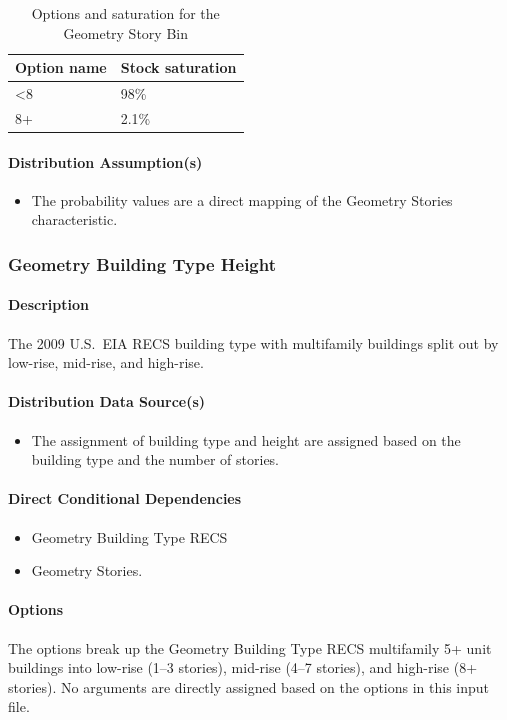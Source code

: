 \begin{longtable}[]{@{}ll@{}}
\caption{Options and saturation for the Geometry Story Bin}  \\
\toprule\noalign{}
Option name & Stock saturation \\
\midrule\noalign{}
\endhead
\bottomrule\noalign{}
\endlastfoot
\textless8 & 98\% \\
8+ & 2.1\% \\
\end{longtable}


\paragraph{Distribution Assumption(s)}
\begin{itemize}
    \item The probability values are a direct mapping of the Geometry Stories characteristic.
\end{itemize}

\subsubsection{Geometry Building Type Height}
\paragraph{Description}
The 2009 U.S.~EIA RECS building type with multifamily buildings split out by low-rise, mid-rise, and high-rise.

\paragraph{Distribution Data Source(s)}
\begin{itemize}
    \item The assignment of building type and height are assigned based on the building type and the number of stories.
\end{itemize}

\paragraph{Direct Conditional Dependencies}
\begin{itemize}
    \item Geometry Building Type RECS
    \item Geometry Stories.
\end{itemize}

\paragraph{Options}
The options break up the Geometry Building Type RECS multifamily 5+ unit buildings into low-rise (1--3 stories), mid-rise (4--7 stories), and high-rise (8+ stories). No arguments are directly assigned based on the options in this input file. 

